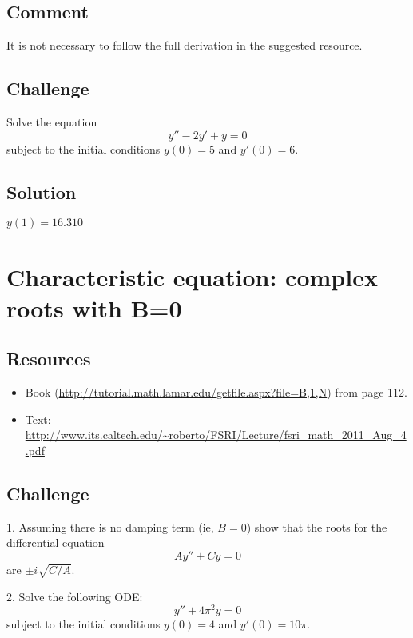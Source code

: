 \subsection*{Comment}
It is not necessary to follow the full derivation in the suggested resource.

\subsection*{Challenge}
Solve the equation
\begin{equation}
    y'' - 2y' + y = 0
\end{equation}
subject to the initial conditions $y(0)=5$ and $y'(0)=6$.

\subsection*{Solution}
$y(1)=16.310$




\newpage
\section{Characteristic equation: complex roots with B=0}

\subsection*{Resources}
\begin{itemize}
    \item Book (\url{http://tutorial.math.lamar.edu/getfile.aspx?file=B,1,N}) from page 112.
    \item Text: \url{http://www.its.caltech.edu/~roberto/FSRI/Lecture/fsri_math_2011_Aug_4.pdf}
\end{itemize}

\subsection*{Challenge}
1. Assuming there is no damping term (ie, $B=0$) show that the roots for the differential equation
\begin{equation}
    A y'' + Cy = 0
\end{equation}
are $\pm i \sqrt{C/A}$.

2. Solve the following ODE:
\begin{equation}
    \label{eq:cecr}
    y'' + 4 \pi^2 y = 0
\end{equation}
subject to the initial conditions $y(0)=4$ and $y'(0)=10 \pi$.

